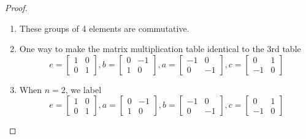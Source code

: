 \begin{proof}
    \begin{enumerate}[label={\textbf{\alph*.}}]
        \item These groups of 4 elements are commutative.
        \item One way to make the matrix multiplication table identical to the 3rd table
              \[
                  e = \begin{bmatrix}
                      1 & 0 \\
                      0 & 1
                  \end{bmatrix},
                  b = \begin{bmatrix}
                      0 & -1 \\
                      1 & 0
                  \end{bmatrix},
                  a = \begin{bmatrix}
                      -1 & 0  \\
                      0  & -1
                  \end{bmatrix},
                  c = \begin{bmatrix}
                      0  & 1 \\
                      -1 & 0
                  \end{bmatrix}
              \]
        \item When $n = 2$, we label
              \[
                  e = \begin{bmatrix}
                      1 & 0 \\
                      0 & 1
                  \end{bmatrix},
                  a = \begin{bmatrix}
                      0 & -1 \\
                      1 & 0
                  \end{bmatrix},
                  b = \begin{bmatrix}
                      -1 & 0  \\
                      0  & -1
                  \end{bmatrix},
                  c = \begin{bmatrix}
                      0  & 1 \\
                      -1 & 0
                  \end{bmatrix}
              \]
    \end{enumerate}
\end{proof}

